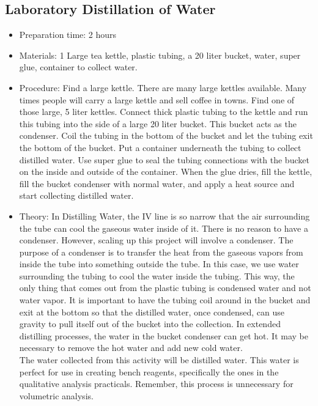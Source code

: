 \subsection{Laboratory Distillation of Water}
\begin{itemize}
\item{Preparation time: 2 hours}
\item{Materials: 1 Large tea kettle, plastic tubing, a 20 liter bucket, water, super glue, container to collect water.}
\item{Procedure: Find a large kettle. There are many large kettles available. Many times people will carry a large kettle and sell coffee in towns. Find one of those large, 5 liter kettles. Connect thick plastic tubing to the kettle and run this tubing into the side of a large 20 liter bucket. This bucket acts as the condenser. Coil the tubing in the bottom of the bucket and let the tubing exit the bottom of the bucket. Put a container underneath the tubing to collect distilled water. Use super glue to seal the tubing connections with the bucket on the inside and outside of the container. When the glue dries, fill the kettle, fill the bucket condenser with normal water, and apply a heat source and start collecting distilled water.}
\item{Theory: In Distilling Water, the IV line is so narrow that the air surrounding the tube can cool the gaseous water inside of it. There is no reason to have a condenser. However, scaling up this project will involve a condenser. The purpose of a condenser is to transfer the heat from the gaseous vapors from inside the tube into something outside the tube. In this case, we use water surrounding the tubing to cool the water inside the tubing. This way, the only thing that comes out from the plastic tubing is condensed water and not water vapor. It is important to have the tubing coil around in the bucket and exit at the bottom so that the distilled water, once condensed, can use gravity to pull itself out of the bucket into the collection. In extended distilling processes, the water in the bucket condenser can get hot. It may be necessary to remove the hot water and add new cold water.\\
The water collected from this activity will be distilled water. This water is perfect for use in creating bench reagents, specifically the ones in the qualitative analysis practicals. Remember, this process is unnecessary for volumetric analysis.}
\end{itemize}

